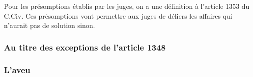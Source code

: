 Pour les présomptions établis par les juges, on a une définition à l'article 1353 du C.Civ. Ces présomptions vont permettre aux juges de déliers les affaires qui n'aurait pas de solution sinon. 

\subsubsection{Au titre des exceptions de l'article 1348}




\subsubsection{L'aveu}












